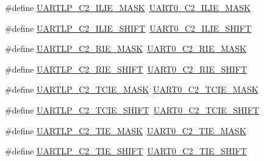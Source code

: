\begin{DoxyCompactItemize}
\item 
\#define \hyperlink{group___backward___compatibility___symbols_ga4be20f5bad98489c568fb934dcd22d87}{U\+A\+R\+T\+L\+P\+\_\+\+C2\+\_\+\+I\+L\+I\+E\+\_\+\+M\+A\+SK}~\hyperlink{group___u_a_r_t0___register___masks_ga10be4cac887b9aa3c11bbfef25808578}{U\+A\+R\+T0\+\_\+\+C2\+\_\+\+I\+L\+I\+E\+\_\+\+M\+A\+SK}
\item 
\#define \hyperlink{group___backward___compatibility___symbols_gab90e873c1b169d382f638afbf736e569}{U\+A\+R\+T\+L\+P\+\_\+\+C2\+\_\+\+I\+L\+I\+E\+\_\+\+S\+H\+I\+FT}~\hyperlink{group___u_a_r_t0___register___masks_ga4ab02fff3512ff6b92e5aecd62049c39}{U\+A\+R\+T0\+\_\+\+C2\+\_\+\+I\+L\+I\+E\+\_\+\+S\+H\+I\+FT}
\item 
\#define \hyperlink{group___backward___compatibility___symbols_gac3c789d6eafa116990b4ead8ff24877c}{U\+A\+R\+T\+L\+P\+\_\+\+C2\+\_\+\+R\+I\+E\+\_\+\+M\+A\+SK}~\hyperlink{group___u_a_r_t0___register___masks_ga9e2ddb43bcd4b9554e0c7a6fa0402efb}{U\+A\+R\+T0\+\_\+\+C2\+\_\+\+R\+I\+E\+\_\+\+M\+A\+SK}
\item 
\#define \hyperlink{group___backward___compatibility___symbols_gaad81a706759dd0db2ca7d73b26c54329}{U\+A\+R\+T\+L\+P\+\_\+\+C2\+\_\+\+R\+I\+E\+\_\+\+S\+H\+I\+FT}~\hyperlink{group___u_a_r_t0___register___masks_gac718305b3ddae3fe258e2735f8a074bf}{U\+A\+R\+T0\+\_\+\+C2\+\_\+\+R\+I\+E\+\_\+\+S\+H\+I\+FT}
\item 
\#define \hyperlink{group___backward___compatibility___symbols_ga96867f1c59f537c310fa32eb0722e075}{U\+A\+R\+T\+L\+P\+\_\+\+C2\+\_\+\+T\+C\+I\+E\+\_\+\+M\+A\+SK}~\hyperlink{group___u_a_r_t0___register___masks_ga8d9362d72300e5dcee78580a773b60c9}{U\+A\+R\+T0\+\_\+\+C2\+\_\+\+T\+C\+I\+E\+\_\+\+M\+A\+SK}
\item 
\#define \hyperlink{group___backward___compatibility___symbols_ga49ccd6611c47944d69e14ec4ad710c0f}{U\+A\+R\+T\+L\+P\+\_\+\+C2\+\_\+\+T\+C\+I\+E\+\_\+\+S\+H\+I\+FT}~\hyperlink{group___u_a_r_t0___register___masks_ga019da6a7871d38f10460ea7ff32b54cc}{U\+A\+R\+T0\+\_\+\+C2\+\_\+\+T\+C\+I\+E\+\_\+\+S\+H\+I\+FT}
\item 
\#define \hyperlink{group___backward___compatibility___symbols_ga8b17a7eada73c13310ee58bd2f2791d5}{U\+A\+R\+T\+L\+P\+\_\+\+C2\+\_\+\+T\+I\+E\+\_\+\+M\+A\+SK}~\hyperlink{group___u_a_r_t0___register___masks_ga57c06364890b354bb04a5f968fc95c42}{U\+A\+R\+T0\+\_\+\+C2\+\_\+\+T\+I\+E\+\_\+\+M\+A\+SK}
\item 
\#define \hyperlink{group___backward___compatibility___symbols_ga151bc121eebeab1b1e5e3b989d513f18}{U\+A\+R\+T\+L\+P\+\_\+\+C2\+\_\+\+T\+I\+E\+\_\+\+S\+H\+I\+FT}~\hyperlink{group___u_a_r_t0___register___masks_ga3d54c6b6f2942f117b23a3dd9b53ec2e}{U\+A\+R\+T0\+\_\+\+C2\+\_\+\+T\+I\+E\+\_\+\+S\+H\+I\+FT}

\end{DoxyCompactItemize}
